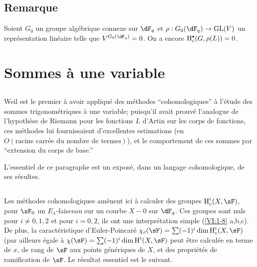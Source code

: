 \subsection{Remarque}\label{VI:2-9}

Soient $G_0$ un groupe alg\'ebrique connexe sur $\dF_q$ et 
$\rho:G_0(\dF_q) \to \operatorname{GL}(V)$ un repr\'esentation lin\'eaire 
telle que $V^{G_0(\dF_q)}=0$. On a encore $\h_c^\bullet(G,\rho(L))=0$. 










\section{Sommes \`a une variable}\label{VI:3}





\subsection{}\label{VI:3-1}

Weil est le premier \`a avoir appliqu\'e des m\'ethodes ``cohomologiques'' \`a 
l'\'etude des sommes trigonom\'etriques \`a une variable; puisqu'il avait 
prouv\'e l'analogue de l'hypoth\`ese de Riemann pour les fonctions $L$ d'Artin 
sur les corps de fonctions, ces m\'ethodes lui fournissaient d'excellentes 
estimations (en $O(\text{racine carr\'ee du nombre de termes})$), et le 
comportement de ces sommes par ``extension du corps de base.'' 

L'essentiel de ce paragraphe est un expos\'e, dans un langage cohomologique, de 
ses r\'esultes. 





\subsection{}\label{VI:3-2}

Les m\'ethodes cohomologiques am\`enent ici \`a calculer des groupes 
$\h_c^i(X,\sF)$, pour $\sF_0$ un $E_\lambda$-faisceau sur un courbe $X-0$ sur 
$\dF_q$. Ces groupes sont nuls pour $i\ne 0,1,2$ et pour 
$i=0,2$, ils ont une interpr\'etation simple (\ref{VI:1-8} a,b,c). De plus, la 
caract\'eristique d'Euler-Poincar\'e 
$\chi_c(\sF) = \sum (-1)^i \dim \h_c^i(X,\sF)$ (par ailleurs \'egale \`a 
$\chi(\sF) = \sum (-1)^i \dim \h^i(X,\sF)$ peut \^etre calcul\'ee en terme de 
$x$, de rang de $\sF$ aux points g\'en\'eriques de $X$, et des propri\'et\'es 
de ramification de $\sF$. Le r\'esultat essentiel est le suivant. 

